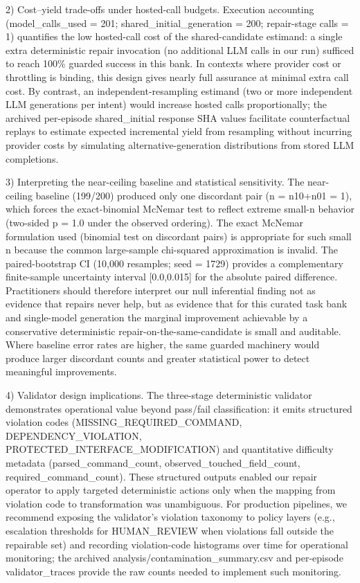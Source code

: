 \documentclass[conference]{IEEEtran}
\begin{document}
2) Cost--yield trade-offs under hosted-call budgets. Execution accounting (model\_calls\_used = 201; shared\_initial\_generation = 200; repair-stage calls = 1) quantifies the low hosted-call cost of the shared-candidate estimand: a single extra deterministic repair invocation (no additional LLM calls in our run) sufficed to reach 100\% guarded success in this bank. In contexts where provider cost or throttling is binding, this design gives nearly full assurance at minimal extra call cost. By contrast, an independent-resampling estimand (two or more independent LLM generations per intent) would increase hosted calls proportionally; the archived per-episode shared\_initial response SHA values facilitate counterfactual replays to estimate expected incremental yield from resampling without incurring provider costs by simulating alternative-generation distributions from stored LLM completions.

3) Interpreting the near-ceiling baseline and statistical sensitivity. The near-ceiling baseline (199/200) produced only one discordant pair (n = n10+n01 = 1), which forces the exact-binomial McNemar test to reflect extreme small-n behavior (two-sided p = 1.0 under the observed ordering). The exact McNemar formulation used (binomial test on discordant pairs) is appropriate for such small n because the common large-sample chi-squared approximation is invalid. The paired-bootstrap CI (10,000 resamples; seed = 1729) provides a complementary finite-sample uncertainty interval [0.0,0.015] for the absolute paired difference. Practitioners should therefore interpret our null inferential finding not as evidence that repairs never help, but as evidence that for this curated task bank and single-model generation the marginal improvement achievable by a conservative deterministic repair-on-the-same-candidate is small and auditable. Where baseline error rates are higher, the same guarded machinery would produce larger discordant counts and greater statistical power to detect meaningful improvements.

4) Validator design implications. The three-stage deterministic validator demonstrates operational value beyond pass/fail classification: it emits structured violation codes (MISSING\_REQUIRED\_COMMAND, DEPENDENCY\_VIOLATION, PROTECTED\_INTERFACE\_MODIFICATION) and quantitative difficulty metadata (parsed\_command\_count, observed\_touched\_field\_count, required\_command\_count). These structured outputs enabled our repair operator to apply targeted deterministic actions only when the mapping from violation code to transformation was unambiguous. For production pipelines, we recommend exposing the validator's violation taxonomy to policy layers (e.g., escalation thresholds for HUMAN\_REVIEW when violations fall outside the repairable set) and recording violation-code histograms over time for operational monitoring; the archived analysis/contamination\_summary.csv and per-episode validator\_traces provide the raw counts needed to implement such monitoring.
\end{document}

